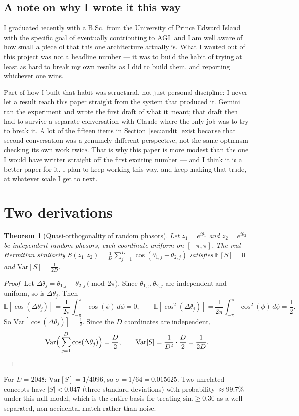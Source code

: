 \documentclass[11pt,letterpaper]{article}
\newtheorem{theorem}{Theorem}
\begin{document}
\subsection*{A note on why I wrote it this way}

I graduated recently with a B.Sc.\ from the University of Prince Edward Island with the specific goal of eventually contributing to AGI, and I am well aware of how small a piece of that this one architecture actually is. What I wanted out of this project was not a headline number --- it was to build the habit of trying at least as hard to break my own results as I did to build them, and reporting whichever one wins.

Part of how I built that habit was structural, not just personal discipline: I never let a result reach this paper straight from the system that produced it. Gemini ran the experiment and wrote the first draft of what it meant; that draft then had to survive a separate conversation with Claude where the only job was to try to break it. A lot of the fifteen items in Section~\ref{sec:audit} exist because that second conversation was a genuinely different perspective, not the same optimism checking its own work twice. That is why this paper is more modest than the one I would have written straight off the first exciting number --- and I think it is a better paper for it. I plan to keep working this way, and keep making that trade, at whatever scale I get to next.

\appendix

\section{Two derivations}
\label{app:proofs}

\begin{theorem}[Quasi-orthogonality of random phasors]
\label{thm:quasiortho}
Let $z_1 = e^{i\theta_1}$ and $z_2 = e^{i\theta_2}$ be independent random phasors, each coordinate uniform on $[-\pi,\pi]$. The real Hermitian similarity $S(z_1,z_2) = \frac{1}{D}\sum_{j=1}^{D}\cos(\theta_{1,j}-\theta_{2,j})$ satisfies $\mathbb{E}[S] = 0$ and $\mathrm{Var}[S] = \frac{1}{2D}$.
\end{theorem}
\begin{proof}
Let $\Delta\theta_j = \theta_{1,j} - \theta_{2,j} \pmod{2\pi}$. Since $\theta_{1,j},\theta_{2,j}$ are independent and uniform, so is $\Delta\theta_j$. Then
\[
\mathbb{E}[\cos(\Delta\theta_j)] = \frac{1}{2\pi}\int_{-\pi}^{\pi}\cos(\phi)\,d\phi = 0, \qquad
\mathbb{E}[\cos^2(\Delta\theta_j)] = \frac{1}{2\pi}\int_{-\pi}^{\pi}\cos^2(\phi)\,d\phi = \frac{1}{2}.
\]
So $\mathrm{Var}[\cos(\Delta\theta_j)] = \tfrac{1}{2}$. Since the $D$ coordinates are independent,
\[
\mathrm{Var}\Big(\sum_{j=1}^D \cos(\Delta\theta_j)\Big) = \frac{D}{2}, \qquad
\mathrm{Var}[S] = \frac{1}{D^2}\cdot\frac{D}{2} = \frac{1}{2D}. \qedhere
\]
\end{proof}
\noindent For $D=2048$: $\mathrm{Var}[S] = 1/4096$, so $\sigma = 1/64 = 0.015625$. Two unrelated concepts have $|S| < 0.047$ (three standard deviations) with probability $\approx 99.7\%$ under this null model, which is the entire basis for treating $\mathrm{sim} \geq 0.30$ as a well-separated, non-accidental match rather than noise.
\end{document}
